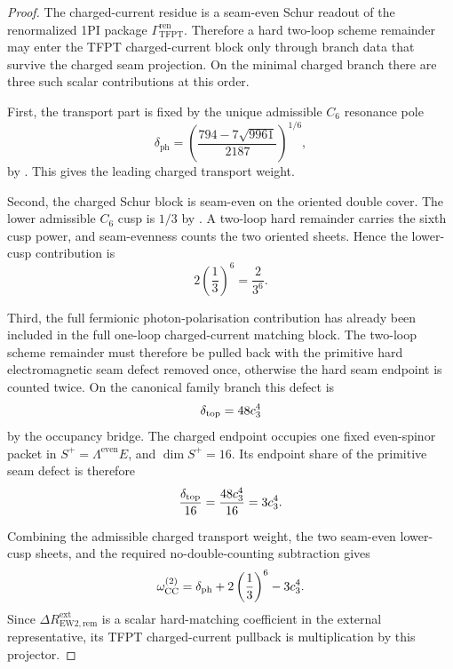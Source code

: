 \begin{proof}
The charged-current residue is a seam-even Schur readout of the renormalized 1PI package
$\Gamma_{\mathrm{TFPT}}^{\mathrm{ren}}$. Therefore a hard two-loop scheme remainder may enter the
TFPT charged-current block only through branch data that survive the charged seam projection. On the
minimal charged branch there are three such scalar contributions at this order.

First, the transport part is fixed by the unique admissible $C_6$ resonance pole
\[
\delta_{\mathrm{ph}}
=
\left(
\frac{794-7\sqrt{9961}}{2187}
\right)^{1/6},
\]
by . This gives the leading charged transport weight.

Second, the charged Schur block is seam-even on the oriented double cover. The lower admissible
$C_6$ cusp is $1/3$ by . A two-loop
hard remainder carries the sixth cusp power, and seam-evenness counts the two oriented sheets.
Hence the lower-cusp contribution is
\[
2\left(\frac13\right)^6=\frac{2}{3^6}.
\]

Third, the full fermionic photon-polarisation contribution has already been included in the full
one-loop charged-current matching block. The two-loop scheme remainder must therefore be pulled
back with the primitive hard electromagnetic seam defect removed once, otherwise the hard seam
endpoint is counted twice. On the canonical family branch this defect is
\[
\delta_{\mathrm{top}}=48c_3^4
\]
by the occupancy bridge. The charged endpoint occupies one fixed even-spinor packet in
$S^+=\Lambda^{\mathrm{even}}E$, and $\dim S^+=16$. Its endpoint share of the primitive seam defect is
therefore
\[
\frac{\delta_{\mathrm{top}}}{16}=\frac{48c_3^4}{16}=3c_3^4.
\]

Combining the admissible charged transport weight, the two seam-even lower-cusp sheets, and the
required no-double-counting subtraction gives
\[
\omega_{\mathrm{CC}}^{(2)}
=
\delta_{\mathrm{ph}}
+
2\left(\frac13\right)^6
-
3c_3^4.
\]
Since $\Delta R_{\mathrm{EW2},\mathrm{rem}}^{\mathrm{ext}}$ is a scalar hard-matching coefficient in
the external representative, its TFPT charged-current pullback is multiplication by this projector.
\end{proof}

